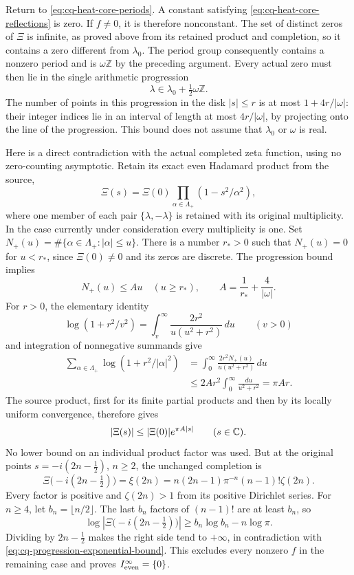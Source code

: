 Return to \eqref{eq:cq-heat-core-periods}. A constant satisfying
\eqref{eq:cq-heat-core-reflections} is zero. If $f\ne0$, it is
therefore nonconstant. The set of distinct zeros of $\Xi$ is
infinite, as proved above from its retained product and completion,
so it contains a zero different from $\lambda_0$.
The period group consequently contains a nonzero period and is
$\omega\mathbb Z$ by the preceding argument. Every actual zero
must then lie in the single arithmetic progression
\begin{equation}\label{eq:cq-heat-core-zero-progression}
 \lambda\in\lambda_0+\tfrac12\omega\mathbb Z.
\end{equation}
The number of points in this progression in the disk $|s|\leq r$
is at most $1+4r/|\omega|$: their integer indices lie in an
interval of length at most $4r/|\omega|$, by projecting onto
the line of the progression. This bound does not assume that
$\lambda_0$ or $\omega$ is real.

Here is a direct contradiction with the actual completed zeta
function, using no zero-counting asymptotic. Retain its exact
even Hadamard product from the source,
\[
 \Xi(s)=\Xi(0)\prod_{\alpha\in\Lambda_+}
                    (1-s^2/\alpha^2),
\]
where one member of each pair $\{\lambda,-\lambda\}$ is
retained with its original multiplicity. In the case currently
under consideration every multiplicity is one.
Set $N_+(u)=\#\{\alpha\in\Lambda_+:|\alpha|\leq u\}$.
There is a number $r_*>0$ such that $N_+(u)=0$ for $u<r_*$,
since $\Xi(0)\ne0$ and its zeros are discrete.
The progression bound implies
\[
 N_+(u)\leq Au\quad(u\geq r_*),\qquad
 A=\frac1{r_*}+\frac4{|\omega|}.
\]
For $r>0$, the elementary identity
\[
 \log(1+r^2/v^2)
   =\int_v^\infty\frac{2r^2}{u(u^2+r^2)}\,du
 \qquad(v>0)
\]
and integration of nonnegative summands give
\[
 \begin{aligned}
 \sum_{\alpha\in\Lambda_+}\log(1+r^2/|\alpha|^2)
 &=\int_0^\infty\frac{2r^2N_+(u)}{u(u^2+r^2)}\,du\\
 &\leq2Ar^2\int_0^\infty\frac{du}{u^2+r^2}
 =\pi Ar .
 \end{aligned}
\]
The source product, first for its finite partial products and
then by its locally uniform convergence, therefore gives
\begin{equation}\label{eq:cq-progression-exponential-bound}
 |\Xi(s)|\leq|\Xi(0)|e^{\pi A|s|}\qquad(s\in\mathbb C).
\end{equation}
No lower bound on an individual product factor was used.
But at the original points $s=-i(2n-\tfrac12)$, $n\geq2$,
the unchanged completion is
\[
 \Xi\bigl(-i(2n-\tfrac12)\bigr)
 =\xi(2n)
 =n(2n-1)\pi^{-n}(n-1)!\zeta(2n).
\]
Every factor is positive and $\zeta(2n)>1$ from its positive
Dirichlet series. For $n\geq4$, let $b_n=\lfloor n/2\rfloor$.
The last $b_n$ factors of $(n-1)!$ are at least $b_n$, so
\[
 \log\left|\Xi\bigl(-i(2n-\tfrac12)\bigr)\right|
 \geq b_n\log b_n-n\log\pi .
\]
Dividing by $2n-\tfrac12$ makes the right side tend to
$+\infty$, in contradiction with
\eqref{eq:cq-progression-exponential-bound}.
This excludes every nonzero $f$ in the remaining case and
proves $I_{\rm even}^{\infty}=\{0\}$.

